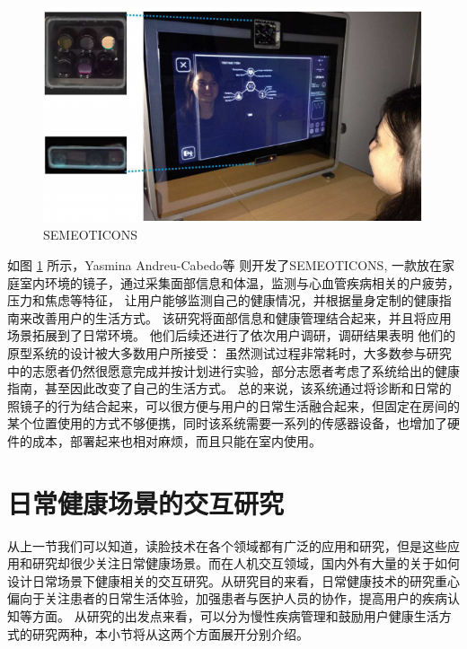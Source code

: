 \begin{figure}[h]
    \centering
    \includegraphics[width=12cm]{images/mirror.png}
    \caption{SEMEOTICONS}
    \label{fig:seme}
\end{figure}
如图 \ref{fig:seme} 所示，Yasmina Andreu-Cabedo等  \cite{andreu2015mirror}则开发了SEMEOTICONS, 一款放在家庭室内环境的镜子，通过采集面部信息和体温，监测与心血管疾病相关的户疲劳，压力和焦虑等特征， 让用户能够监测自己的健康情况，并根据量身定制的健康指南来改善用户的生活方式。
 该研究将面部信息和健康管理结合起来，并且将应用场景拓展到了日常环境。
 他们后续还进行了依次用户调研，调研结果表明\cite{coppini2017user} 他们的原型系统的设计被大多数用户所接受： 虽然测试过程非常耗时，大多数参与研究中的志愿者仍然很愿意完成并按计划进行实验，部分志愿者考虑了系统给出的健康指南，甚至因此改变了自己的生活方式。
总的来说，该系统通过将诊断和日常的照镜子的行为结合起来，可以很方便与用户的日常生活融合起来，但固定在房间的某个位置使用的方式不够便携，同时该系统需要一系列的传感器设备，也增加了硬件的成本，部署起来也相对麻烦，而且只能在室内使用。

\section{日常健康场景的交互研究}

从上一节我们可以知道，读脸技术在各个领域都有广泛的应用和研究，但是这些应用和研究却很少关注日常健康场景。而在人机交互领域，国内外有大量的关于如何设计日常场景下健康相关的交互研究。从研究目的来看，日常健康技术的研究重心偏向于关注患者的日常生活体验，加强患者与医护人员的协作，提高用户的疾病认知等方面\cite{nunes2015self-care}。
从研究的出发点来看，可以分为慢性疾病管理和鼓励用户健康生活方式的研究两种，本小节将从这两个方面展开分别介绍。

